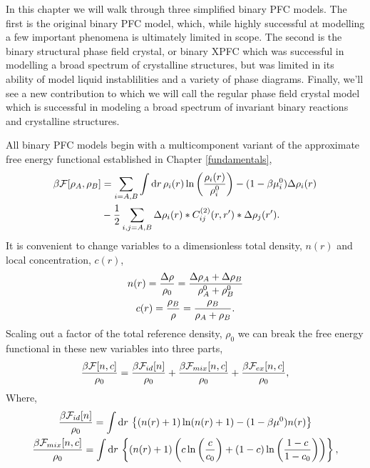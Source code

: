 In this chapter we will walk through three simplified binary PFC models. The
first is the original binary PFC model, which, while highly successful at
modelling a few important phenomena is ultimately limited in scope. The second
is the binary structural phase field crystal, or binary XPFC which was
successful in modelling a broad spectrum of crystalline structures, but was
limited in its ability of model liquid instablilities and a variety of phase
diagrams. Finally, we'll see a new contribution to which we will call the
regular phase field crystal model which is successful in modeling a broad
spectrum of invariant binary reactions and crystalline structures. 

All binary PFC models begin with a multicomponent variant of the approximate
free energy functional established in Chapter \ref{fundamentals},
%
\begin{align}
    \label{binary_cdft_free_energy}
    \beta\mathcal{F}[\rho_A, \rho_B] &= \sum_{i=A, B} \int \mathrm{d}r 
        \,\rho_i(r) \ln\left(\frac{\rho_i(r)}{\rho_i^0}\right) 
        - (1 - \beta\mu_i^0)\Delta\rho_i(r)\\
    &- \frac{1}{2} \sum_{i,j=A, B} \Delta\rho_i(r) \ast C^{(2)}_{ij}(r, r^\prime) 
        \ast \Delta\rho_j(r^\prime). \nonumber
\end{align}
%
It is convenient to change variables to a dimensionless total density, $n(r)$
and local concentration, $c(r)$,
%
\begin{gather}
    n(r) = \frac{\Delta \rho}{\rho_0} = \frac{\Delta\rho_A + \Delta\rho_B}{\rho_A^0 + \rho_B^0} \\
    c(r) = \frac{\rho_B}{\rho} = \frac{\rho_B}{\rho_A + \rho_B}.
\end{gather}
%
Scaling out a factor of the total reference density, $\rho_0$ we can break the
free energy functional in these new variables into three parts,
%
\begin{equation}
    \label{binary_total_free_energy}
    \frac{\beta\mathcal{F}[n, c]}{\rho_0} = \frac{\beta\mathcal{F}_{id}[n]}{\rho_0} 
        + \frac{\beta\mathcal{F}_{mix}[n, c]}{\rho_0}
        + \frac{\beta\mathcal{F}_{ex}[n, c]}{\rho_0},
\end{equation}
%
Where,
%
\begin{gather}
    \label{binary_ideal}
    \frac{\beta\mathcal{F}_{id}[n]}{\rho_0} =
        \int \mathrm{d}r \,\left\lbrace (n(r) + 1)\ln(n(r) + 1) 
        - (1 - \beta\mu^0)n(r) \right\rbrace \\
    \label{binary_mixing}
    \frac{\beta\mathcal{F}_{mix}[n, c]}{\rho_0} =
        \int \mathrm{d}r \,\left\lbrace (n(r) + 1)\left( 
            c\ln\left(\frac{c}{c_0}\right) + (1-c)\ln\left(\frac{1-c}{1-c_0}\right) \right)\right\rbrace, 
\end{gather}
